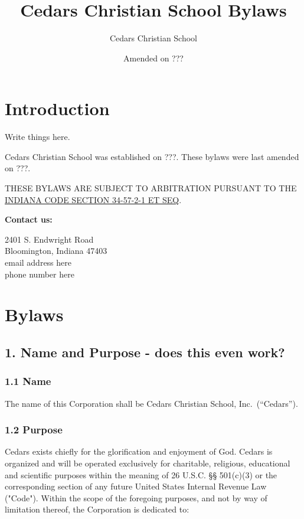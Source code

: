 \documentclass[
]{book}
\title{Cedars Christian School Bylaws}
\author{Cedars Christian School}
\date{Amended on ???}
\begin{document}
\maketitle

{
\hypersetup{linkcolor=}
\setcounter{tocdepth}{1}
\tableofcontents
}
\chapter*{Introduction}\label{introduction}

Write things here.

Cedars Christian School was established on ???. These bylaws were last amended on ???.

THESE BYLAWS ARE SUBJECT TO ARBITRATION PURSUANT TO THE \href{https://iga.in.gov/legislative/laws/2022/ic/titles/034\#34-57-2-1}{INDIANA CODE SECTION 34-57-2-1 ET SEQ}.

\textbf{Contact us:}

2401 S. Endwright Road\\
Bloomington, Indiana 47403\\
email address here\\
phone number here

\mainmatter

\chapter{Bylaws}\label{bylaws}

\section{1. Name and Purpose - does this even work?}\label{name-and-purpose---does-this-even-work}

\subsection{1.1 Name}\label{name}

The name of this Corporation shall be Cedars Christian School, Inc.~(``Cedars'').

\subsection{1.2 Purpose}\label{purpose}

Cedars exists chiefly for the glorification and enjoyment of God. Cedars is organized and will be operated exclusively for charitable, religious, educational and scientific purposes within the meaning of 26 U.S.C. §§ 501(c)(3) or the corresponding section of any future United States Internal Revenue Law ("Code"). Within the scope of the foregoing purposes, and not by way of limitation thereof, the Corporation is dedicated to:
\end{document}
